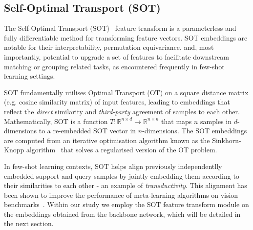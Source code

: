 \subsection{Self-Optimal Transport (SOT)}


The Self-Optimal Transport (SOT)~\cite{sot} feature transform is a parameterless and fully differentiable method for transforming feature vectors. SOT embeddings are notable for their interpretability, permutation equivariance, and, most importantly, potential to upgrade a set of features to facilitate downstream matching or grouping related tasks, as encountered frequently in few-shot learning settings.

SOT fundamentally utilises Optimal Transport (OT) on a square distance matrix (e.g. cosine similarity matrix) of input features, leading to embeddings that reflect the \textit{direct} similarity and \textit{third-party} agreement of samples to each other. Mathematically, SOT is a function \(T: \mathbb{R}^{n \times d} \rightarrow \mathbb{R}^{n \times n}\) that maps \(n\) samples in \(d\)-dimensions to a re-embedded SOT vector in \(n\)-dimensions. The SOT embeddings are computed from an iterative optimisation algorithm known as the Sinkhorn-Knopp algorithm~\cite{sinkhorn-knopp} that solves a regularised version of the OT problem.

In few-shot learning contexts, SOT helps align previously independentlly embedded support and query samples by jointly embedding them according to their similarities to each other - an example of \textit{transductivity}. This alignment has been shown to improve the performance of meta-learning algorithms on vision benchmarks~\cite{sot}. Within our study we employ the SOT feature transform module on the embeddings obtained from the backbone network, which will be detailed in the next section.



